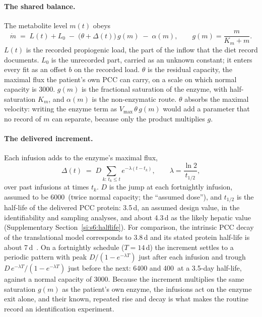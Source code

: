 \paragraph{The shared balance.} The metabolite level $m(t)$ obeys
\begin{equation}
\label{seq:s1-balance}
\dot m \;=\; L(t) + L_0 \;-\; \bigl(\theta+\Delta(t)\bigr)\,g(m) \;-\; \alpha(m),
\qquad g(m)=\frac{m}{K_m+m}.
\end{equation}
$L(t)$ is the recorded propiogenic load, the part of the inflow that the diet record
documents. $L_0$ is the unrecorded part, carried as an unknown constant; it enters every fit
as an offset $b$ on the recorded load. $\theta$ is the residual capacity, the maximal flux
the patient's own PCC can carry, on a scale on which normal capacity is 3000\um. $g(m)$ is
the fractional saturation of the enzyme, with half-saturation $K_m$, and $\alpha(m)$ is the
non-enzymatic route. $\theta$ absorbs the maximal velocity: writing the enzyme term as
$V_{\max}\,\theta\,g(m)$ would add a parameter that no record of $m$ can separate, because
only the product multiplies $g$.

\paragraph{The delivered increment.} Each infusion adds to the enzyme's maximal flux,
\begin{equation}
\label{seq:s1-delta}
\Delta(t) \;=\; D\sum_{k:\,t_k\le t} e^{-\lambda(t-t_k)},\qquad \lambda=\frac{\ln 2}{t_{1/2}},
\end{equation}
over past infusions at times $t_k$. $D$ is the jump at each fortnightly infusion, assumed to
be 6000\um\ (twice normal capacity; the ``assumed dose''), and $t_{1/2}$ is the half-life of
the delivered PCC protein: 3.5\,d, an assumed design value, in the identifiability and
sampling analyses, and about 4.3\,d as the likely hepatic value (Supplementary
Section~\ref{si:s6:halflife}). For comparison, the intrinsic PCC decay of the translational
model corresponds to 3.8\,d and its stated protein half-life is about
7\,d~\cite{pkpd_translational}. On a fortnightly
schedule ($T=14$\,d) the increment settles to a periodic pattern with peak
$D/(1-e^{-\lambda T})$ just after each infusion and trough
$D\,e^{-\lambda T}/(1-e^{-\lambda T})$ just before the next: 6400 and 400\um\ at a 3.5-day
half-life, against a normal capacity of 3000\um. Because the increment multiplies the same
saturation $g(m)$ as the patient's own enzyme, the infusions act on the enzyme exit alone,
and their known, repeated rise and decay is what makes the routine record an
identification experiment.

